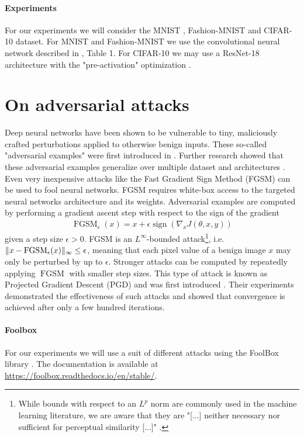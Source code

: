 \documentclass{article}
\begin{document}
\paragraph{Experiments}
For our experiments we will consider the MNIST \cite{deng2012mnist}, Fashion-MNIST \cite{xiao2017fashion} and CIFAR-10 \cite{krizhevsky2009learning} dataset. For MNIST and Fashion-MNIST we use the convolutional neural network described in \cite{carlini2017towards}, Table 1. For CIFAR-10 we may use a ResNet-18 architecture \cite{he2016deep} with the "pre-activation" optimization \cite{he2016identity}. 

	
\section{On adversarial attacks}
Deep neural networks have been shown to be vulnerable to tiny, maliciously crafted perturbations applied to otherwise benign inputs. These so-called "adversarial examples" were first introduced in \cite{Szegedy13}. Further research showed that these adversarial examples generalize over multiple dataset and architectures \cite{goodfellow2014explaining}. Even very inexpensive attacks like the Fast Gradient Sign Method (FGSM) \cite{goodfellow2014explaining} can be used to fool neural networks. FGSM requires white-box access to the targeted neural networks architecture and its weights. Adversarial examples are computed by performing a gradient ascent step with respect to the sign of the gradient
\begin{align*}
	\operatorname{FGSM}_\epsilon(x) = x + \epsilon\operatorname{sign}(\nabla_x J(\theta,x,y)) 
\end{align*}
given a step size $\epsilon>0$. FGSM is an $L^\infty$-bounded attack\footnote{While bounds with respect to an $L^p$ norm are commonly used in the machine learning literature, we are aware that they are "[...] neither necessary nor sufficient for perceptual similarity [...]" \cite{sharif2018suitability}.}, i.e. $\lVert x-\operatorname{FGSM}_\epsilon(x)\rVert_\infty\le\epsilon$, meaning that each pixel value of a benign image $x$ may only be perturbed by up to $\epsilon$.
Stronger attacks can be computed by repeatedly applying $\operatorname{FGSM}$ with smaller step sizes. This type of attack is known as Projected Gradient Descent (PGD) and was first introduced \cite{madry2017towards}. Their experiments demonstrated the effectiveness of such attacks and showed that convergence is achieved after only a few hundred iterations. 

\paragraph{Foolbox}
For our experiments we will use a suit of different attacks using the FoolBox library \cite{rauber2017foolbox}. The documentation is available at \url{https://foolbox.readthedocs.io/en/stable/}. 



\end{document}
